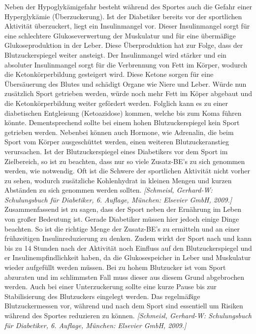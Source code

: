 \documentclass[a4paper,11pt]{article}%
\renewcommand{\\}{\vspace*{0.5\baselineskip} \newline}
\begin{document}
	Neben der Hypoglykämigefahr besteht während des Sportes auch die Gefahr einer Hyperglykämie (Überzuckerung). Ist der Diabetiker bereits vor der sportlichen Aktivität überzuckert, liegt ein Insulinmangel vor. Dieser Insulinmangel sorgt für eine schlechtere Glukoseverwertung der Muskulatur und für eine übermäßige Glukoseproduktion in der Leber. Diese Überproduktion hat zur Folge, dass der Blutzuckerspiegel weiter ansteigt. Der Insulinmangel wird stärker und ein absoluter Insulinmangel sorgt für die Verbrennung von Fett im Körper, wodurch die Ketonkörperbildung gesteigert wird. Diese Ketone sorgen für eine Übersäuerung des Blutes und schädigt Organe wie Niere und Leber. Würde nun zusätzlich Sport getrieben werden, würde noch mehr Fett im Köper abgebaut und die Ketonkörperbildung weiter gefördert werden. Folglich kann es zu einer diabetischen Entgleisung (Ketoazidose) kommen, welche bis zum Koma führen könnte. Dementsprechend sollte bei einem hohen Blutzuckerspiegel kein Sport getrieben werden. Nebenbei können auch Hormone, wie Adrenalin, die beim Sport vom Körper ausgeschüttet werden, einen weiteren Blutzuckeranstieg verursachen. \newline
	Ist der Blutzuckerspiegel eines Diabetikers vor dem Sport im Zielbereich, so ist zu beachten, dass nur so viele Zusatz-BE’s zu sich genommen werden, wie notwendig. Oft ist die Schwere der sportlichen Aktivität nicht vorher zu sehen, wodurch zusätzliche Kohlenhydrat in kleinen Mengen und kurzen Abständen zu sich genommen werden sollten. \emph{[Schmeisl, Gerhard-W: Schulungsbuch für Diabetiker, 6. Auflage, München: Elsevier GmbH, 2009.]} \\
	Zusammenfassend ist zu sagen, dass der Sport neben der Ernährung im Leben von großer Bedeutung ist. Gerade Diabetiker müssen hier jedoch einige Dinge beachten. So ist die richtige Menge der Zusatz-BE’s zu ermitteln und an einer frühzeitigen Insulinreduzierung zu denken. Zudem wirkt der Sport nach und kann bis zu 14 Stunden nach der Aktivität noch Einfluss auf den Blutzuckerspiegel und er Insulinempfindlichkeit haben, da die Glukosespeicher in Leber und Muskulatur wieder aufgefüllt werden müssen. Bei zu hohem Blutzucker ist vom Sport abzuraten und im schlimmsten Fall muss dieser aus diesem Grund abgebrochen werden. Auch bei einer Unterzuckerung sollte eine kurze Pause bis zur Stabilisierung des Blutzuckers eingelegt werden. Das regelmäßige Blutzuckermessen vor, während und nach dem Sport sind essentiell um Risiken während des Sportes reduzieren zu können. \emph{[Schmeisl, Gerhard-W: Schulungsbuch für Diabetiker, 6. Auflage, München: Elsevier GmbH, 2009.]} 
\end{document}
